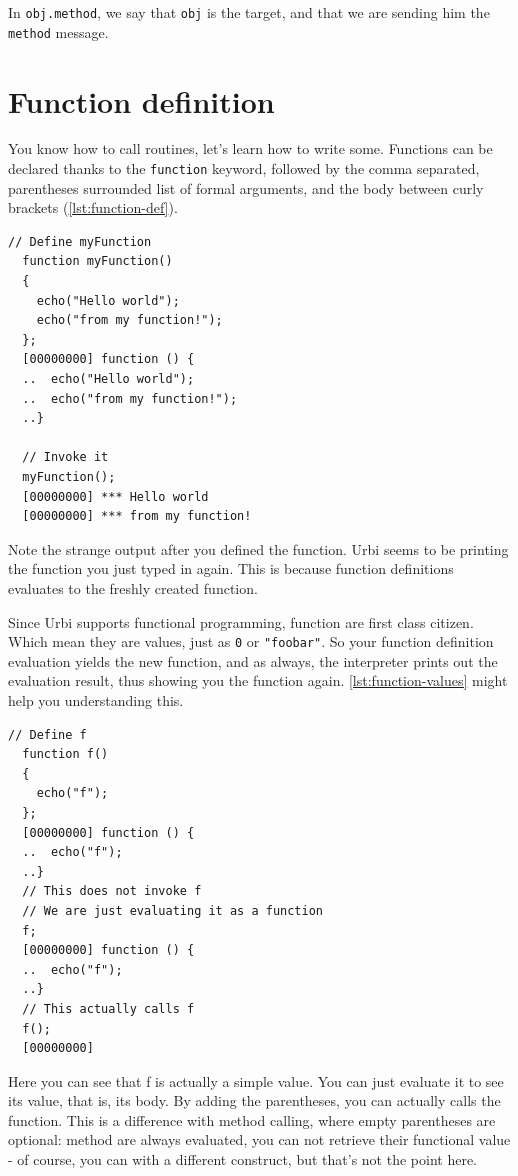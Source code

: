 \documentclass[openright,twoside,12pt]{report}
\newcommand{\urbi}{Urbi\xspace}
\newcommand{\lst}[1]{\autoref{lst:#1}}
\begin{document}
In \lstinline|obj.method|, we say that \texttt{obj} is the target, and
that we are sending him the \texttt{method} message.

\section{Function definition}

You know how to call routines, let's learn how to write
some. Functions can be declared thanks to the \texttt{function}
keyword, followed by the comma separated, parentheses surrounded list
of formal arguments, and the body between curly brackets (\lst{function-def}).

\begin{lstlisting}[caption=Defining a function,label=lst:function-def]
  // Define myFunction
  function myFunction()
  {
    echo("Hello world");
    echo("from my function!");
  };
  [00000000] function () {
  ..  echo("Hello world");
  ..  echo("from my function!");
  ..}

  // Invoke it
  myFunction();
  [00000000] *** Hello world
  [00000000] *** from my function!
\end{lstlisting}

Note the strange output after you defined the function. \urbi seems to
be printing the function you just typed in again. This is because
function definitions evaluates to the freshly created function.

Since \urbi supports functional programming, function are first class
citizen. Which mean they are values, just as \texttt{0} or
\texttt{"foobar"}. So your function definition evaluation yields the
new function, and as always, the interpreter prints out the evaluation
result, thus showing you the function again. \lst{function-values}
might help you understanding this.


\begin{lstlisting}[caption=Function as values,label=lst:function-values]
  // Define f
  function f()
  {
    echo("f");
  };
  [00000000] function () {
  ..  echo("f");
  ..}
  // This does not invoke f
  // We are just evaluating it as a function
  f;
  [00000000] function () {
  ..  echo("f");
  ..}
  // This actually calls f
  f();
  [00000000]
\end{lstlisting}

Here you can see that f is actually a simple value. You can just
evaluate it to see its value, that is, its body. By adding the
parentheses, you can actually calls the function. This is a difference
with method calling, where empty parentheses are optional: method are
always evaluated, you can not retrieve their functional value - of
course, you can with a different construct, but that's not the point
here.
\end{document}
